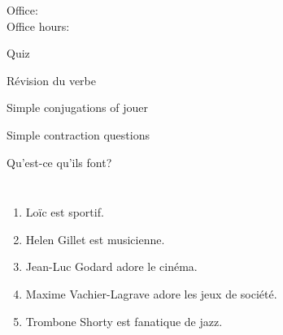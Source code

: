 \documentclass{beamer}
\subtitle[Loisirs (jouer) et prépositions]{Les loisirs que nous jouons et \lexi{à} et \lexi{de}}
\begin{document}
  \begin{frame}
    \titlepage
    \tiny{Office: \\
          Office hours: }
  \end{frame}

  \begin{frame}{}
    \begin{center}
      \Large Quiz
    \end{center}
  \end{frame}

  \begin{frame}{Révision du verbe}
    \begin{center}
      
    \end{center}
  \end{frame}
  
  \begin{frame}{}
    Simple conjugations of jouer
  \end{frame}

  \begin{frame}{}
    Simple contraction questions
  \end{frame}

  \begin{frame}{Qu'est-ce qu'ils font?}
    \begin{columns}
        \begin{enumerate}
          \item Loïc est sportif.
          \item<2-> Helen Gillet est musicienne.
          \item<3-> Jean-Luc Godard adore le cinéma.
          \item<4-> Maxime Vachier-Lagrave adore les jeux de société.
          \item<5-> Trombone Shorty est fanatique de jazz.
        \end{enumerate}
        \begin{minipage}[c][0.6\textheight]{\linewidth}
          \begin{center}
          \end{center}
        \end{minipage}
    \end{columns}
  \end{frame}
\end{document}

